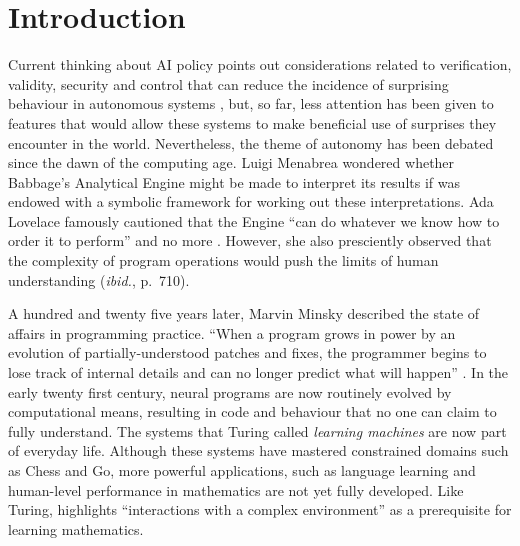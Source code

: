 \ifdraft{\tableofcontents
\clearpage
}{}

\section{Introduction} \label{sec:why-this-matters}
Current thinking about AI policy points out considerations related to verification, validity, security and control that can reduce the incidence of surprising behaviour in autonomous systems \cite{research-priorities}, but, so far, less attention has been given to features that would allow these systems to make beneficial use of surprises they encounter in the world. 
%
Nevertheless, the theme of autonomy has been debated since the dawn of the computing age.  Luigi Menabrea \cite[p.~689]{menabrea1842sketch} wondered whether Babbage's Analytical Engine might be made to interpret its results if was endowed with a symbolic framework for working out these interpretations.
Ada Lovelace famously cautioned that the Engine ``can do whatever we know how to order it to perform'' and no more \cite[p.~722]{lovelace}.  However, she also presciently observed that the complexity of program operations would push the limits of human understanding (\emph{ibid.}, p.~710).

A hundred and twenty five years later, Marvin Minsky described the state of affairs in programming practice.  ``When a program grows in power by an evolution of partially-understood patches and fixes, the programmer begins to lose track of internal details and can no longer predict what will happen'' \cite{minsky1967programming}.
In the early twenty first century, neural programs are now routinely evolved by computational means, resulting in code and behaviour that no one can claim to fully understand.  The systems that Turing called \emph{learning machines} \cite{turing1950mind} are now part of everyday life.  Although these systems have mastered constrained domains such as Chess and Go, more powerful applications, such as language learning and human-level performance in mathematics \cite{turing1948intelligentreport} are not yet fully developed.     
Like Turing, \citet[p.~2015]{sloman2008well} highlights ``interactions with a complex environment'' as a prerequisite for learning mathematics.    

